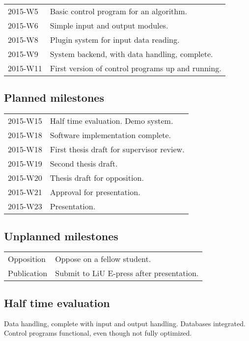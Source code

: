 \documentclass[11pt]{article}
\begin{document}
\begin{tabular}{l l}
    2015-W5     & Basic control program for an algorithm.  \\
    2015-W6     & Simple input and output modules.  \\
    2015-W8     & Plugin system for input data reading.  \\
    2015-W9     & System backend, with data handling, complete.  \\
    2015-W11    & First version of control programs up and running. \\
\end{tabular}

\subsection*{Planned milestones}

\begin{tabular}{l l}
    2015-W15    & Half time evaluation. Demo system. \\
    2015-W18    & Software implementation complete. \\
    2015-W18    & First thesis draft for supervisor review. \\
    2015-W19    & Second thesis draft. \\
    2015-W20    & Thesis draft for opposition. \\
    2015-W21    & Approval for presentation. \\
    2015-W23    & Presentation. \\
\end{tabular}

\subsection*{Unplanned milestones}

\begin{tabular}{l l}
    Opposition  & Oppose on a fellow student. \\
    Publication  & Submit to LiU E-press after presentation. \\
\end{tabular}

\subsection*{Half time evaluation}

Data handling, complete with input and output handling. Databases integrated. Control programs functional, even though not fully optimized.
\end{document}
